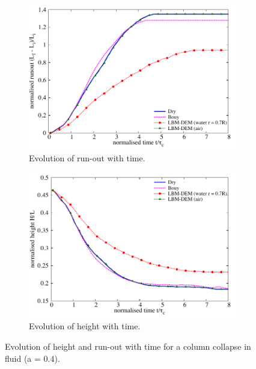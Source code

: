 \begin{figure}[htpb]
\centering
\begin{subfigure}[t]{0.9\textwidth}
\includegraphics[width=\textwidth]{Runout_a04f}
\caption{Evolution of run-out with time.}
\label{fig:Runout_a04f}
\end{subfigure}

\begin{subfigure}[t]{0.9\textwidth}
\centering
\includegraphics[width=\textwidth]{Height_a04f}
\caption{Evolution of height with time.}
\label{fig:Height_a04f}
\end{subfigure}
\caption{Evolution of height and run-out with time for a column collapse in 
fluid (a = 0.4).}
\label{fig:a04_run_height}
\end{figure}

